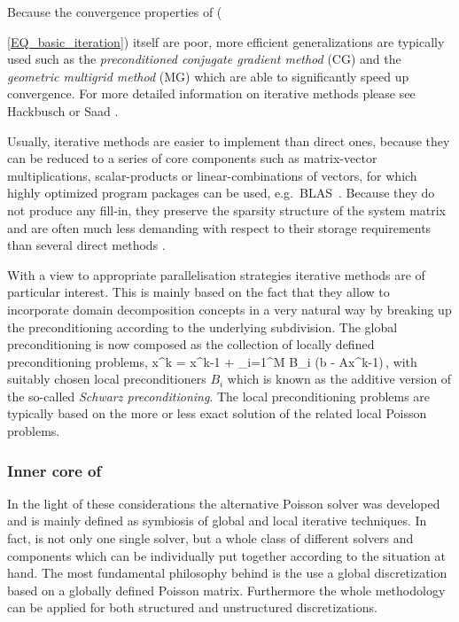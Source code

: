 Because the convergence properties of ({\ref{EQ_basic_iteration}) itself are poor, more efficient generalizations are typically used such as the {\it preconditioned conjugate gradient method} (CG) and the {\it geometric multigrid method}  (MG) which are able to significantly speed up convergence. For more detailed information on iterative methods please see Hackbusch \cite{Hackbusch:1994} or Saad \cite{Saad:2003}.

Usually, iterative methods are easier to implement than direct ones, because they can be reduced to a series of core components such as matrix-vector multiplications, scalar-products or linear-combinations of vectors, for which highly optimized program packages can be used, e.g.\ BLAS~\cite{Dongarra:1998, Dongarra:2002}.
Because they do not produce any fill-in, they preserve the sparsity structure of the system matrix and are often much less demanding with respect to their storage requirements than several direct methods .

With a view to appropriate parallelisation strategies iterative methods are of particular interest. This is mainly based on the fact that they allow to incorporate domain decomposition concepts in a very natural way by breaking up the preconditioning according to the underlying subdivision. The global preconditioning is now composed as the collection of locally defined preconditioning problems,
\be x^k = x^{k-1} + \sum_{i=1}^M  B_i  (b - Ax^{k-1})\,, 
\label{EQ_basic_iteration_dd}
\ee
with suitably chosen local preconditioners  $B_i$ which is known as the additive version of the so-called {\it Schwarz preconditioning}. The local preconditioning problems are typically based on the more or less exact solution of the related local Poisson problems.

\newpage
\subsubsection{Inner core of \scarc{}}
In the light of these considerations the alternative Poisson solver \scarc{} was developed and is mainly defined as symbiosis of global and local iterative techniques. In fact, \scarc{} is not only one single solver, but a whole class of different solvers and components  which can be individually put together according to the situation at hand.
The most fundamental philosophy behind is the use a global discretization based on a globally defined Poisson matrix. Furthermore the whole methodology can be applied for both structured and unstructured discretizations. 

}
